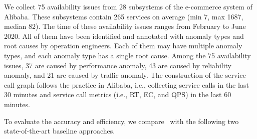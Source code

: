 We collect 75 availability issues from 28 subsystems of the e-commerce system of Alibaba.
These subsystems contain 265 services on average (min 7, max 1687, median 82).
The time of these availability issues ranges from February to June 2020.
All of them have been identified and annotated with anomaly types and root causes by operation engineers.
Each of them may have multiple anomaly types, and each anomaly type has a single root cause.
Among the 75 availability issues, 37 are caused by performance anomaly, 43 are caused by reliability anomaly, and 21 are caused by traffic anomaly.
The construction of the service call graph follows the practice in Alibaba, i.e., collecting service calls in the last 30 minutes and service call metrics (i.e., RT, EC, and QPS) in the last 60 minutes.


To evaluate the accuracy and efficiency, we compare \app~with the following two state-of-the-art baseline approaches.


